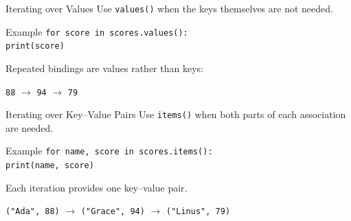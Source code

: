 \documentclass[aspectratio=169,10pt]{beamer}
\begin{document}
\begin{frame}{Iterating over Values}
  Use \texttt{values()} when the keys themselves are not needed.

  \begin{block}{Example}
    \texttt{for score in scores.values():}\\
    \hspace{0.20in}\texttt{print(score)}
  \end{block}

  Repeated bindings are values rather than keys:

  \begin{center}
    \texttt{88} $\rightarrow$ \texttt{94} $\rightarrow$ \texttt{79}
  \end{center}
\end{frame}

\begin{frame}{Iterating over Key--Value Pairs}
  Use \texttt{items()} when both parts of each association are needed.

  \begin{block}{Example}
    \texttt{for name, score in scores.items():}\\
    \hspace{0.20in}\texttt{print(name, score)}
  \end{block}

  Each iteration provides one key--value pair.

  \begin{center}
    \texttt{("Ada", 88)} $\rightarrow$ \texttt{("Grace", 94)} $\rightarrow$ \texttt{("Linus", 79)}
  \end{center}
\end{frame}
\end{document}

